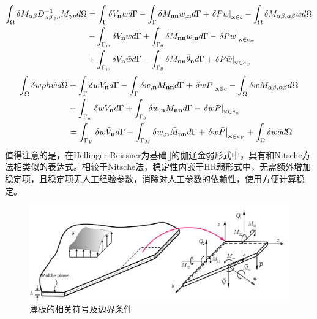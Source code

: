 \documentclass[a4paper]{article}
\begin{document}
\begin{equation}
    \begin{split}
        \int_\Omega {\delta {M_{\alpha \beta }}D_{\alpha \beta \gamma \eta }^{ - 1}{M_{\gamma \eta }}d\Omega }&=\int_\Gamma  {\delta {V_{\bf{n}}}wd\Gamma }  - \int_\Gamma  {\delta {M_{{\bf{nn}}}}{w_{,{\bf{n}}}}d\Gamma }+{\left. {\delta Pw} \right|_{{\bf{x}} \in c}} - \int_\Omega  {\delta {M_{\alpha \beta ,\alpha \beta }}wd\Omega } \\
        &-\int_{{\Gamma _w}} {\delta {V_{\bf{n}}}wd\Gamma }  + \int_{{\Gamma _\theta }} {\delta {M_{{\bf{nn}}}}{w_{,{\bf{n}}}}d\Gamma }  - {\left. {\delta Pw} \right|_{{\bf{x}} \in {c_w}}}\\
        &+\int_{{\Gamma _w}} {\delta {V_{\bf{n}}}\bar wd\Gamma }  - \int_{{\Gamma _\theta }} {\delta {M_{{\bf{nn}}}}{{\bar \theta }_{\bf{n}}}d\Gamma }  + {\left. {\delta P\bar w} \right|_{{\bf{x}} \in {c_w}}}
    \end{split}
\end{equation}
\begin{equation}
        \begin{split}
            \int_{\Omega}\delta w\rho h\ddot{w}d\Omega &+ \int_\Gamma  {\delta w{V_{\bf{n}}}d\Gamma } - \int_\Gamma  {\delta {w_{,{\bf{n}}}}{M_{{\bf{nn}}}}d\Gamma }  + {\left. {\delta wP} \right|_{{\bf{x}} \in c}} - \int_\Omega  {\delta w{M_{\alpha \beta ,\alpha\beta}}d\Omega }\\
            &- \int_{{\Gamma _w}} {\delta w{V_{\bf{n}}}d\Gamma }  + \int_{{\Gamma _\theta }} {\delta {w_{,{\bf{n}}}}{M_{{\bf{nn}}}}d\Gamma }  - {\left. {\delta wP} \right|_{{\bf{x}} \in {c_w}}}\\
            &= \int_{{\Gamma _V}} {\delta w{{\bar V}_{\bf{n}}}d\Gamma }  - \int_{{\Gamma _M}} {\delta {w_{,{\bf{n}}}}{{\bar M}_{{\bf{nn}}}}d\Gamma }  + {\left. {\delta w\bar P} \right|_{{\bf{x}} \in {c_P}}} + \int_\Omega  {\delta w\bar qd\Omega} 
    \end{split}
\end{equation}
    值得注意的是，在Hellinger-Reissner为基础[]的伽辽金弱形式中，具有和Nitsche方法相类似的表达式。相较于Nitsche法，稳定性内嵌于HR弱形式中，无需额外增加稳定项，且稳定项无人工经验参数，消除对人工参数的依赖性，使用方便计算稳定。
\begin{figure}[!h]
    \centering
    \includegraphics[scale=0.7]{firgure/boban.png}
    \caption{薄板的相关符号及边界条件}
\end{figure}\newpage
\end{document}
